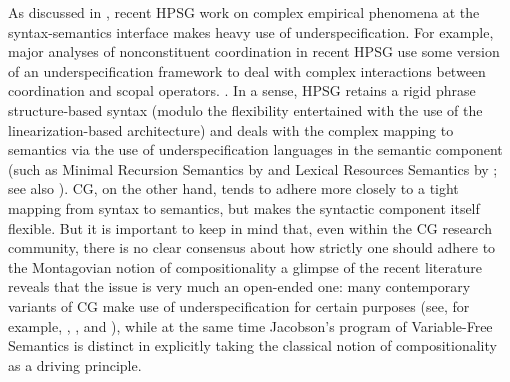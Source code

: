 \documentclass[output=paper
                ,modfonts
 	        ,biblatex
                ,babelshorthands
                ,newtxmath
                ,draftmode
                ,colorlinks, citecolor=brown
]{langscibook}
\begin{document}



As discussed in , recent HPSG work on
complex empirical phenomena at the syntax-semantics interface makes
heavy use of underspecification. For example, major analyses of
nonconstituent coordination in recent HPSG use some version of an
underspecification framework to deal with complex interactions between
coordination and scopal operators.
\citep{Yatabe2001a,BS2004a,parkea18gapping,parkDiss,yatabe-tam2017}.
In a sense, HPSG retains a rigid phrase structure-based syntax (modulo
the flexibility entertained with the use of the linearization-based
architecture) and deals with the complex mapping to semantics via the
use of underspecification languages in the semantic component (such as
Minimal Recursion Semantics by \citealt{CFPS2005a} and Lexical Resources
Semantics by \citealt{RS2004a-u}; see also ). CG, on the other hand, tends to adhere
more closely to a tight mapping from syntax to semantics, but makes
the syntactic component itself flexible. But it is important to keep
in mind that, even within the CG research community,
there is no clear consensus about 
how strictly one should adhere to the
Montagovian notion of compositionality \emdashUS a glimpse of the recent 
literature reveals that the issue is very much an open-ended one: 
many contemporary variants of CG 
make use of underspecification for certain purposes (see, for example, 
\citealt[Chapter~7]{steedman2012}, \citealt{bekki14},
\citealt{bekkimineshima17} and \citealt{kubotaEA2019Geach}), 
while at the same time Jacobson's 
\citeyearpar{Jacobson1999a,Jacobson2000a} program of Variable-Free
Semantics is distinct in explicitly taking the classical notion of compositionality
as a driving principle.
\end{document}
